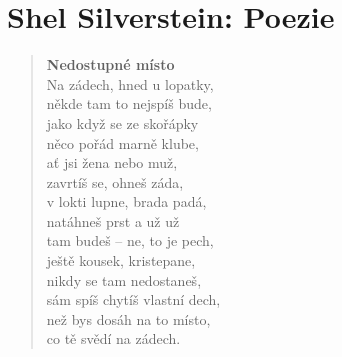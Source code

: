 \section{Shel Silverstein: Poezie}

\begin{verse}
\textbf{Nedostupné místo}\\
\smallskip
Na zádech, hned u lopatky, \\
někde tam to nejspíš bude,\\
jako když se ze skořápky\\
něco pořád marně klube,  \\
ať jsi žena nebo muž,  \\
zavrtíš se, ohneš záda,\\  
v lokti lupne, brada padá,\\
natáhneš prst a už už  \\
tam budeš – ne, to je pech,  \\
ještě kousek, kristepane,  \\
nikdy se tam nedostaneš,\\  
sám spíš chytíš vlastní dech,\\
než bys dosáh na to místo,  \\
co tě svědí na zádech.  
\end{verse}

\bigskip

